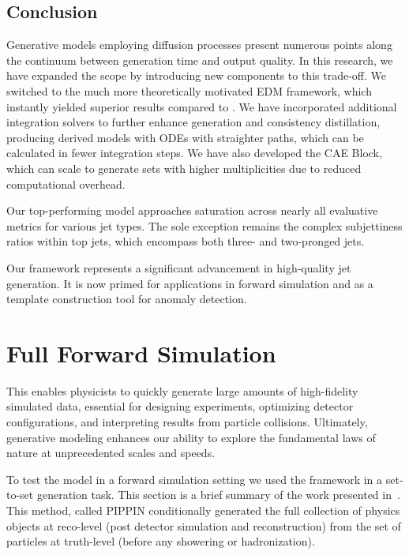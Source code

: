 \subsection{Conclusion}

Generative models employing diffusion processes present numerous points along the continuum between generation time and output quality.
In this research, we have expanded the scope by introducing new components to this trade-off.
We switched to the much more theoretically motivated EDM framework, which instantly yielded superior results compared to \pcjedi.
We have incorporated additional integration solvers to further enhance generation and consistency distillation, producing derived models with ODEs with straighter paths, which can be calculated in fewer integration steps.
We have also developed the CAE Block, which can scale to generate sets with higher multiplicities due to reduced computational overhead.

Our top-performing model approaches saturation across nearly all evaluative metrics for various jet types.
The sole exception remains the complex subjettiness ratios within top jets, which encompass both three- and two-pronged jets.

Our framework represents a significant advancement in high-quality jet generation.
It is now primed for applications in forward simulation and as a template construction tool for anomaly detection.

\section{Full Forward Simulation}

This enables physicists to quickly generate large amounts of high-fidelity simulated data, essential for designing experiments, optimizing detector configurations, and interpreting results from particle collisions. Ultimately, generative modeling enhances our ability to explore the fundamental laws of nature at unprecedented scales and speeds.



To test the model in a forward simulation setting we used the \pcdroid framework in a set-to-set generation task.
This section is a brief summary of the work presented in~\textcite{PIPPIN}.
This method, called PIPPIN conditionally generated the full collection of physics objects at reco-level (post detector simulation and reconstruction) from the set of particles at truth-level (before any showering or hadronization).

